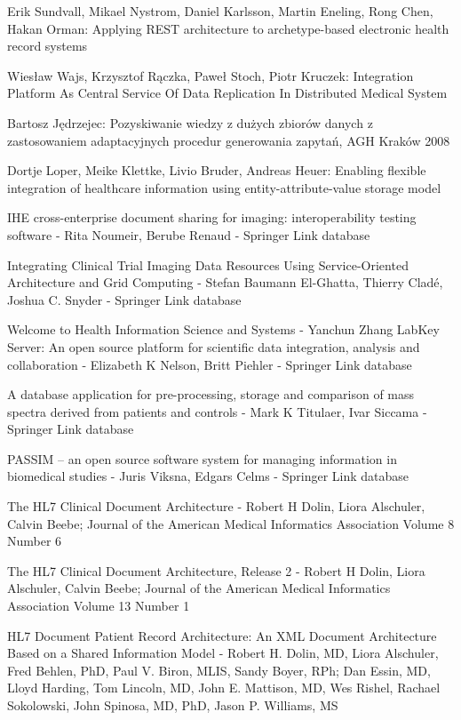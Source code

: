 \begin{thebibliography}{1}

Erik Sundvall, Mikael Nystrom, Daniel Karlsson, Martin Eneling, Rong Chen, Hakan Orman: Applying REST architecture to archetype-based electronic health record systems

Wiesław Wajs, Krzysztof Rączka, Paweł Stoch, Piotr Kruczek: Integration Platform As Central Service Of Data Replication In Distributed Medical System

Bartosz Jędrzejec: Pozyskiwanie wiedzy z dużych zbiorów danych z zastosowaniem adaptacyjnych procedur generowania zapytań, AGH Kraków 2008

Dortje Loper, Meike Klettke, Livio Bruder, Andreas Heuer: Enabling flexible integration of healthcare information using entity-attribute-value storage model

IHE cross-enterprise document sharing for imaging: interoperability testing software - Rita Noumeir, Berube Renaud - Springer Link database

Integrating Clinical Trial Imaging Data Resources Using Service-Oriented Architecture and Grid Computing - Stefan Baumann El-Ghatta, Thierry Cladé, Joshua C. Snyder - Springer Link database

Welcome to Health Information Science and Systems - Yanchun Zhang
LabKey Server: An open source platform for scientific data integration, analysis and collaboration - Elizabeth K Nelson, Britt Piehler - Springer Link database

A database application for pre-processing, storage and comparison of mass spectra derived from patients and controls - Mark K Titulaer, Ivar Siccama - Springer Link database

PASSIM – an open source software system for managing information in biomedical studies - Juris Viksna, Edgars Celms - Springer Link database

The HL7 Clinical Document Architecture - Robert H Dolin, Liora Alschuler, Calvin Beebe; Journal of the American Medical Informatics Association Volume 8 Number 6

The HL7 Clinical Document Architecture, Release 2 - Robert H Dolin, Liora Alschuler, Calvin Beebe; Journal of the American Medical Informatics Association Volume 13 Number 1

HL7 Document Patient Record Architecture: An XML Document Architecture Based on a Shared Information Model - Robert H. Dolin, MD, Liora Alschuler, Fred Behlen, PhD, Paul V. Biron, MLIS, Sandy Boyer, RPh; Dan Essin, MD, Lloyd Harding, Tom Lincoln, MD, John E. Mattison, MD, Wes Rishel, Rachael Sokolowski, John Spinosa, MD, PhD, Jason P. Williams, MS


\end{thebibliography}
